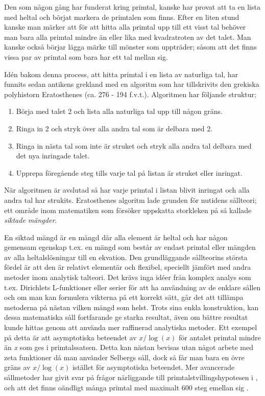 Den som någon gång har funderat kring primtal, kanske har provat att ta en lista med heltal och börjat markera de primtalen som finns. 
Efter en liten stund kanske man märker att för att hitta alla primtal upp till ett visst tal behöver man bara alla primtal mindre än eller lika med kvadratroten av det talet. 
Man kanske också börjar lägga märke till mönster som uppträder; såsom att det finns vissa par av primtal som bara har ett tal mellan sig. 

Idén bakom denna process, att hitta primtal i en lista av naturliga tal, har funnits sedan antikens grekland med en algoritm som har tillskrivits den grekiska polyhistorn Eratosthenes (ca. 276 - 194 f.v.t.). Algoritmen har följande struktur;
\begin{enumerate}
    \item Börja med talet 2 och lista alla naturliga tal upp till någon gräns.
    \item Ringa in 2 och stryk över alla andra tal som är delbara med 2.
    \item Ringa in nästa tal som inte är struket och stryk alla andra tal delbara med det nya inringade talet.
    \item Upprepa föregående steg tills varje tal på listan är struket eller inringat. 
\end{enumerate}
När algoritmen är avslutad så har varje primtal i listan blivit inringat och alla andra tal har strukits. 
Eratosthenes algoritm lade grunden för nutidens sållteori; ett område inom matematiken som försöker uppskatta storkleken på så kallade \textit{siktade mängder}. 

En siktad mängd är en mängd där alla element är heltal och har någon gemensam egenskap t.ex. en mängd som består av endast primtal eller mängden av alla heltalslösningar till en ekvation. 
Den grundläggande sållteorins största fördel är att den är relativt elementär och flexibel, speciellt jämfört med andra metoder inom analytisk talteori. 
Det krävs inga idéer från komplex analys som t.ex. Dirichlets L-funktioner eller serier för att ha användning av de enklare sållen och om man kan formulera vikterna på ett korrekt sätt, går det att tillämpa metoderna på nästan vilken mängd som helst. 
Trots sina enkla konstruktion, kan dessa matematiska såll fortfarande ge starka resultat, även om bättre resultat kunde hittas genom att använda mer raffinerad analytiska metoder. 
Ett exempel på detta är att asymptotiska beteendet av \(x/\log(x)\) för antalet primtal mindre än \textit{x} som ges i primtalssatsen. 
Detta kan nästan bevisas utan något arbete med zeta funktioner då man använder Selbergs såll, dock så får man bara en övre gräns av \(x/\log(x)\) istället för asymptotiska beteendet. 
Mer avancerade sållmetoder har givit svar på frågor närliggande till primtalstvillingshypotesen i \cite{chen2Prime}, och att det finns oändligt många primtal med maximalt 600 steg emellan sig \cite{mayBound}.


